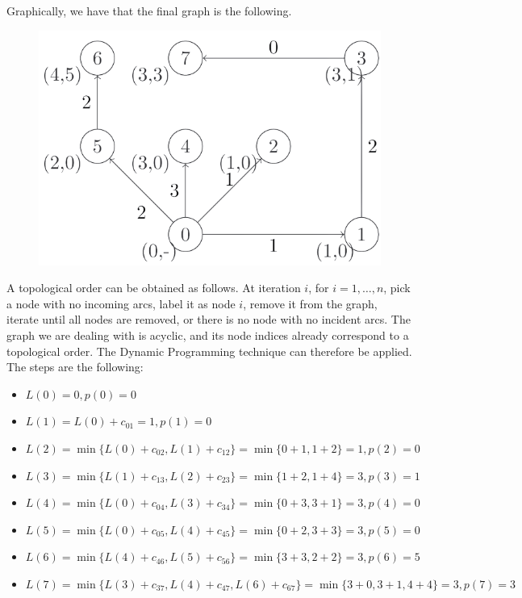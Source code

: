 \documentclass[12pt, a4paper]{report}
\newtheorem[style=M,bodystyle=\normalfont]{theorem}{Theorem}
\newtheorem[style=M,bodystyle=\normalfont]{corollary}{Corollary}
\newtheorem[style=M,bodystyle=\normalfont]{lemma}{Lemma}
\newtheorem[style=M,bodystyle=\normalfont]{definition}{Definition}
\begin{document}
        Graphically, we have that the final graph is the following. 
        \begin{figure}[H]
            \centering
            \includegraphics[width=0.5\linewidth]{images/dijksol.png}
        \end{figure}
        A topological order can be obtained as follows. At iteration $i$, for $i = 1, \dots , n$, pick a node with no incoming arcs, label it as node $i$, remove it from 
        the graph, iterate until all nodes are removed, or there is no node with no incident arcs. The graph we are dealing with is acyclic, and its node indices already 
        correspond to a topological order. The Dynamic Programming technique can therefore be applied. The steps are the following: 
        \begin{itemize}
            \item $L(0) = 0, p(0) = 0$
            \item $L(1) = L(0) + c_{01} = 1, p(1) = 0$
            \item $L(2) = \min\{L(0) + c_{02}, L(1) + c_{12}\} = \min\{0 + 1, 1 + 2\} = 1, p(2) = 0$
            \item $L(3) = \min\{L(1) + c_{13}, L(2) + c_{23}\} = \min\{1 + 2, 1 + 4\} = 3, p(3) = 1$
            \item $L(4) = \min\{L(0) + c_{04}, L(3) + c_{34}\} = \min\{0 + 3, 3 + 1\} = 3, p(4) = 0$
            \item $L(5) = \min\{L(0) + c_{05}, L(4) + c_{45}\} = \min\{0 + 2, 3 + 3\} = 3, p(5) = 0$
            \item $L(6) = \min\{L(4) + c_{46}, L(5) + c_{56}\} = \min\{3 + 3, 2 + 2\} = 3, p(6) = 5$
            \item $L(7) = \min\{L(3) + c_{37}, L(4) + c_{47}, L(6) + c_{67}\} = \min\{3 + 0, 3 + 1, 4 + 4\} = 3, p(7) = 3$
        \end{itemize}

    \newpage
    
\end{document}
